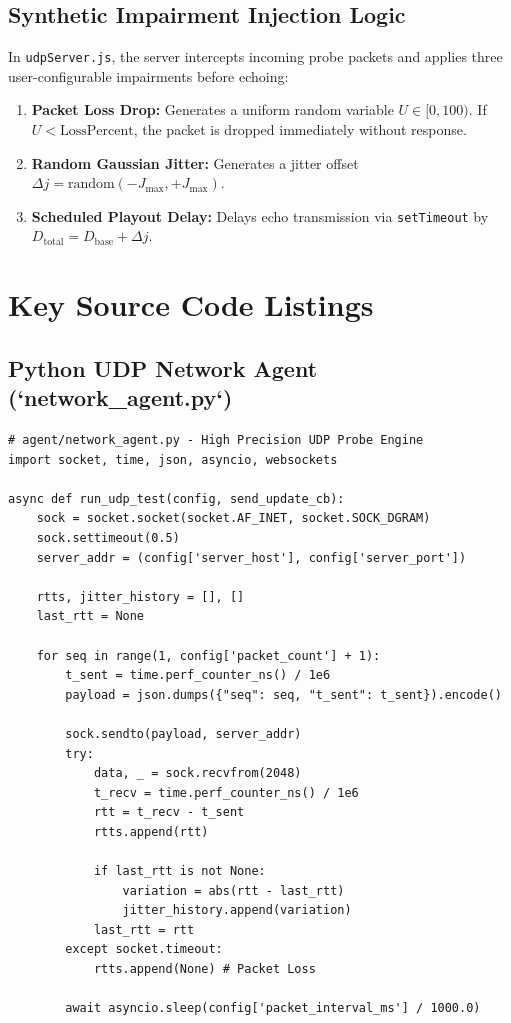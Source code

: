 \documentclass[12pt, a4paper]{report}
\begin{document}
\section{Synthetic Impairment Injection Logic}
In \texttt{udpServer.js}, the server intercepts incoming probe packets and applies three user-configurable impairments before echoing:
\begin{enumerate}
    \item \textbf{Packet Loss Drop:} Generates a uniform random variable $U \in [0, 100)$. If $U < \text{LossPercent}$, the packet is dropped immediately without response.
    \item \textbf{Random Gaussian Jitter:} Generates a jitter offset $\Delta j = \text{random}(-J_{\text{max}}, +J_{\text{max}})$.
    \item \textbf{Scheduled Playout Delay:} Delays echo transmission via \texttt{setTimeout} by $D_{\text{total}} = D_{\text{base}} + \Delta j$.
\end{enumerate}

\newpage
\chapter{Key Source Code Listings}

\section{Python UDP Network Agent (`network\_agent.py`)}
\begin{verbatim}
# agent/network_agent.py - High Precision UDP Probe Engine
import socket, time, json, asyncio, websockets

async def run_udp_test(config, send_update_cb):
    sock = socket.socket(socket.AF_INET, socket.SOCK_DGRAM)
    sock.settimeout(0.5)
    server_addr = (config['server_host'], config['server_port'])
    
    rtts, jitter_history = [], []
    last_rtt = None
    
    for seq in range(1, config['packet_count'] + 1):
        t_sent = time.perf_counter_ns() / 1e6
        payload = json.dumps({"seq": seq, "t_sent": t_sent}).encode()
        
        sock.sendto(payload, server_addr)
        try:
            data, _ = sock.recvfrom(2048)
            t_recv = time.perf_counter_ns() / 1e6
            rtt = t_recv - t_sent
            rtts.append(rtt)
            
            if last_rtt is not None:
                variation = abs(rtt - last_rtt)
                jitter_history.append(variation)
            last_rtt = rtt
        except socket.timeout:
            rtts.append(None) # Packet Loss
            
        await asyncio.sleep(config['packet_interval_ms'] / 1000.0)
\end{verbatim}
\end{document}
